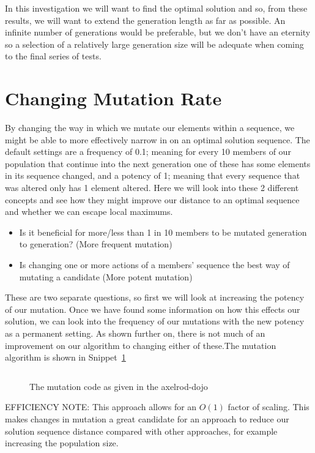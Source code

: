 In this investigation we will want to find the optimal solution and so, from these results, we will want to extend the generation length as far as possible.
An infinite number of generations would be preferable, but we don't have an eternity so a selection of a relatively large generation size will be adequate when coming to the final series of tests.\\

\section{Changing Mutation Rate}\label{sec:changeingmutationrate}
By changing the way in which we mutate our elements within a sequence, we might be able to more effectively narrow in on an optimal solution sequence.
The default settings are a frequency of 0.1; meaning for every 10 members of our population that continue into the next generation one of these has some elements in its sequence changed, and a potency of 1;
meaning that every sequence that was altered only has 1 element altered.
Here we will look into these 2 different concepts and see how they might improve our distance to an optimal sequence and whether we can escape local maximums.
\begin{itemize}
    \item Is it beneficial for more/less than 1 in 10 members to be mutated generation to generation? (More frequent mutation)
    \item Is changing one or more actions of a members' sequence the best way of mutating a candidate (More potent mutation)
\end{itemize}

These are two separate questions, so first we will look at increasing the potency of our mutation.
Once we have found some information on how this effects our solution, we can look into the frequency of our mutations with the new potency as a permanent setting.
As shown further on, there is not much of an improvement on our algorithm to changing either of these.The mutation algorithm is shown in Snippet~\ref{code:mutateFromDojo}\\

\begin{figure}
    \inputminted{python}{code_snippets/mutateFromDojo.py}
    \caption{The mutation code as given in the axelrod-dojo}\label{code:mutateFromDojo}
\end{figure}

EFFICIENCY NOTE\@: This approach allows for an \(O(1)\) factor of scaling.
This makes changes in mutation a great candidate for an approach to reduce our solution sequence distance compared with other approaches, for example increasing the population size.\\

